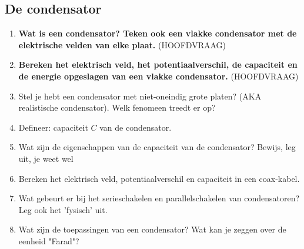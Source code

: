 \documentclass[a4paper,12pt]{article}
\begin{document}
    \subsection{De condensator}
    \begin{enumerate}
        \item \textbf{Wat is een condensator? Teken ook een vlakke condensator met de elektrische velden van elke plaat.} (HOOFDVRAAG)
        \item \textbf{Bereken het elektrisch veld, het potentiaalverschil, de capaciteit en de energie opgeslagen van een vlakke condensator.} (HOOFDVRAAG)
        \item Stel je hebt een condensator met niet-oneindig grote platen? (AKA realistische condensator). Welk fenomeen treedt er op?
        \item Defineer: capaciteit $C$ van de condensator.
        \item Wat zijn de eigenschappen van de capaciteit van de condensator? Bewijs, leg uit, je weet wel
        \item Bereken het elektrisch veld, potentiaalverschil en capaciteit in een coax-kabel.
        \item Wat gebeurt er bij het serieschakelen en parallelschakelen van condensatoren? Leg ook het 'fysisch' uit.
        \item Wat zijn de toepassingen van een condensator? Wat kan je zeggen over de eenheid "Farad"?
    \end{enumerate}
\end{document}
